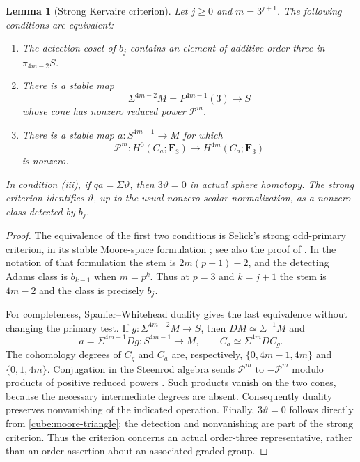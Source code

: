\documentclass[11pt]{article}
\newtheorem{lemma}[theorem]{Lemma}
\theoremstyle{definition}
\theoremstyle{remark}
\numberwithin{equation}{section}
\begin{document}
\begin{lemma}[Strong Kervaire criterion]\label{cube:strong-criterion}
Let \(j\geq0\) and \(m=3^{j+1}\).  The following conditions are equivalent:
\begin{enumerate}[label=\textup{(\roman*)}]
\item The detection coset of \(b_j\) contains an element of additive order
three in \(\pi_{4m-2}S\).
\item There is a stable map
\[
 \Sigma^{4m-2}M=P^{4m-1}(3)\longrightarrow S
\]
whose cone has nonzero reduced power \(\mathcal P^m\).
\item There is a stable map \(a:S^{4m-1}\to M\) for which
\[
 \mathcal P^m:H^0(C_a;\mathbf F_3)\longrightarrow H^{4m}(C_a;\mathbf F_3)
\]
is nonzero.
\end{enumerate}
In condition \textup{(iii)}, if \(qa=\Sigma\vartheta\), then
\(3\vartheta=0\) in actual sphere homotopy.  The strong criterion identifies
\(\vartheta\), up to the usual nonzero scalar normalization, as a nonzero
class detected by \(b_j\).
\end{lemma}

\begin{proof}
The equivalence of the first two conditions is Selick's strong
odd-primary criterion, in its stable Moore-space formulation
\cite[Theorems~1.1 and~3.3]{Selick}; see also the proof of
\cite[Theorem~1.1]{Amelotte}.  In the notation of that formulation the
stem is \(2m(p-1)-2\), and the detecting Adams class is \(b_{k-1}\) when
\(m=p^k\).  Thus at \(p=3\) and \(k=j+1\) the stem is \(4m-2\) and the
class is precisely \(b_j\).

For completeness, Spanier--Whitehead duality gives the last equivalence
without changing the primary test.  If
\(g:\Sigma^{4m-2}M\to S\), then \(DM\simeq\Sigma^{-1}M\) and
\[
 a=\Sigma^{4m-1}Dg:S^{4m-1}\longrightarrow M,\qquad
 C_a\simeq\Sigma^{4m}DC_g.
\]
The cohomology degrees of \(C_g\) and \(C_a\) are, respectively,
\(\{0,4m-1,4m\}\) and \(\{0,1,4m\}\).  Conjugation in the Steenrod
algebra sends \(\mathcal P^m\) to \(-\mathcal P^m\) modulo products of
positive reduced powers
\cite[Section~7, pp.~166--167]{Milnor}.  Such products vanish on the two cones,
because the necessary intermediate degrees are absent.  Consequently
duality preserves nonvanishing of the indicated operation.
Finally, \(3\vartheta=0\) follows directly from
\eqref{cube:moore-triangle}; the detection and nonvanishing are part of
the strong criterion.  Thus the criterion concerns an actual
order-three representative, rather than an order assertion about an
associated-graded group.
\end{proof}
\end{document}
